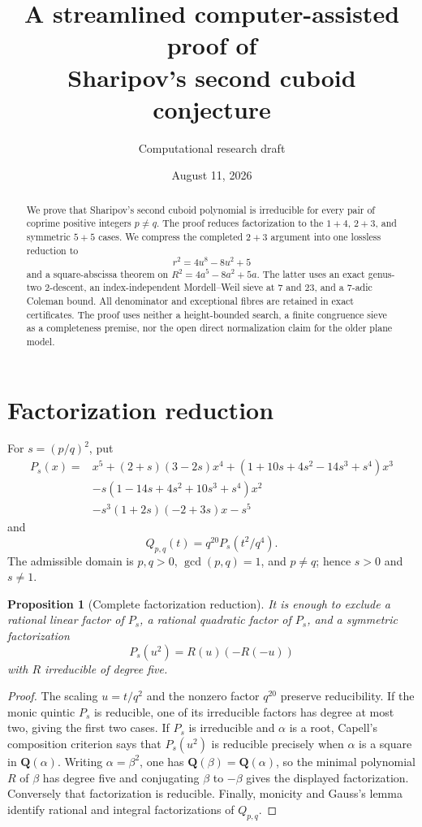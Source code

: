 \documentclass[11pt]{article}
\title{A streamlined computer-assisted proof of\\
Sharipov's second cuboid conjecture}
\author{Computational research draft}
\date{August 11, 2026}
\newtheorem{proposition}[theorem]{Proposition}
\newcommand{\Q}{\mathbf Q}
\begin{document}
\maketitle

\begin{abstract}
We prove that Sharipov's second cuboid polynomial is irreducible for every
pair of coprime positive integers $p\ne q$.  The proof reduces factorization
to the $1+4$, $2+3$, and symmetric $5+5$ cases.  We compress the completed
$2+3$ argument into one lossless reduction to
\[
 r^2=4u^8-8u^2+5
\]
and a square-abscissa theorem on
$R^2=4a^5-8a^2+5a$.  The latter uses an exact genus-two 2-descent, an
index-independent Mordell--Weil sieve at $7$ and $23$, and a $7$-adic
Coleman bound.  All denominator and exceptional fibres are retained in
exact certificates.  The proof uses neither a height-bounded search, a
finite congruence sieve as a completeness premise, nor the open direct
normalization claim for the older plane model.
\end{abstract}

\section{Factorization reduction}

For $s=(p/q)^2$, put
\[
\begin{aligned}
P_s(x)={}&x^5+(2+s)(3-2s)x^4
 +(1+10s+4s^2-14s^3+s^4)x^3\\
&-s(1-14s+4s^2+10s^3+s^4)x^2\\
&-s^3(1+2s)(-2+3s)x-s^5
\end{aligned}
\]
and
\[
 Q_{p,q}(t)=q^{20}P_s(t^2/q^4).
\]
The admissible domain is $p,q>0$, $\gcd(p,q)=1$, and $p\ne q$; hence
$s>0$ and $s\ne1$.

\begin{proposition}[Complete factorization reduction]\label{prop:factor}
It is enough to exclude a rational linear factor of $P_s$, a rational
quadratic factor of $P_s$, and a symmetric factorization
\[
 P_s(u^2)=R(u)(-R(-u))
\]
with $R$ irreducible of degree five.
\end{proposition}

\begin{proof}
The scaling $u=t/q^2$ and the nonzero factor $q^{20}$ preserve
reducibility.  If the monic quintic $P_s$ is reducible, one of its
irreducible factors has degree at most two, giving the first two cases.
If $P_s$ is irreducible and $\alpha$ is a root, Capell's composition
criterion says that $P_s(u^2)$ is reducible precisely when $\alpha$ is a
square in $\Q(\alpha)$.  Writing $\alpha=\beta^2$, one has
$\Q(\beta)=\Q(\alpha)$, so the minimal polynomial $R$ of $\beta$ has degree
five and conjugating $\beta$ to $-\beta$ gives the displayed factorization.
Conversely that factorization is reducible.  Finally, monicity and Gauss's
lemma identify rational and integral factorizations of $Q_{p,q}$.
\end{proof}
\end{document}
